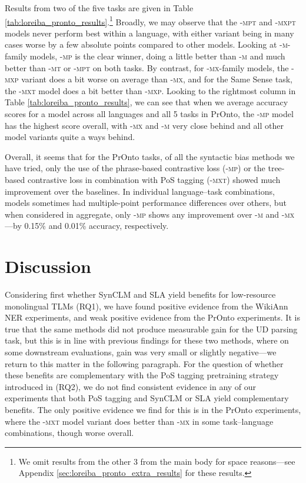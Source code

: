\documentclass[11pt]{article}
\begin{document}
Results from two of the five tasks are given in Table \ref{tab:loreiba_pronto_results}.\footnote{We omit results from the other 3 from the main body for space reasons---see Appendix \ref{sec:loreiba_pronto_extra_results} for these results.}
Broadly, we may observe that the \textsc{-mpt} and \textsc{-mxpt} models never perform best within a language, with either variant being in many cases worse by a few absolute points compared to other models.
Looking at \textsc{-m}-family models, \textsc{-mp} is the clear winner, doing a little better than \textsc{-m} and much better than \textsc{-mt} or \textsc{-mpt} on both tasks.
By contrast, for \textsc{-mx}-family models, the \textsc{-mxp} variant does a bit worse on average than \textsc{-mx}, and for the Same Sense task, the \textsc{-mxt} model does a bit better than \textsc{-mxp}. 
Looking to the rightmost column in Table \ref{tab:loreiba_pronto_results}, we can see that when we average accuracy scores for a model across all languages and all 5 tasks in PrOnto, the \textsc{-mp} model has the highest score overall, with \textsc{-mx} and \textsc{-m} very close behind and all other model variants quite a ways behind.

Overall, it seems that for the PrOnto tasks, of all the syntactic bias methods we have tried, only the use of the phrase-based contrastive loss (\textsc{-mp}) or the tree-based contrastive loss in combination with PoS tagging (\textsc{-mxt}) showed much improvement over the baselines.
In individual language--task combinations, models sometimes had multiple-point performance differences over others, but when considered in aggregate, only \textsc{-mp} shows any improvement over \textsc{-m} and \textsc{-mx}---by 0.15\% and 0.01\% accuracy, respectively.

\section{Discussion}
Considering first whether SynCLM and SLA yield benefits for low-resource monolingual TLMs (RQ1), we have found positive evidence from the WikiAnn NER experiments, and weak positive evidence from the PrOnto experiments.
It is true that the same methods did not produce measurable gain for the UD parsing task, but this is in line with previous findings for these two methods, where on some downstream evaluations, gain was very small or slightly negative---we return to this matter in the following paragraph.
For the question of whether these benefits are complementary with the PoS tagging pretraining strategy introduced in \citet{gessler-zeldes-2022-microbert} (RQ2), we do not find consistent evidence in any of our experiments that both PoS tagging and SynCLM or SLA yield complementary benefits.
The only positive evidence we find for this is in the PrOnto experiments, where the \textsc{-mxt} model variant does better than \textsc{-mx} in some task--language combinations, though worse overall.
\end{document}
